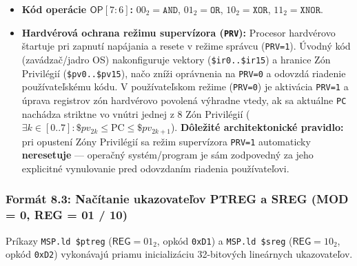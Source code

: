 \documentclass[11pt,a4paper]{article}
\newcommand{\reg}[1]{\texttt{#1}}
\newcommand{\field}[1]{\textsf{#1}}
\begin{document}
\begin{itemize}
  \item \textbf{Kód operácie $\field{OP} [7:6]$:} $00_2 = \texttt{AND}$, $01_2 = \texttt{OR}$, $10_2 = \texttt{XOR}$, $11_2 = \texttt{XNOR}$.
  \item \textbf{Hardvérová ochrana režimu supervízora (\texttt{PRV}):} Procesor hardvérovo štartuje pri zapnutí napájania a resete v režime správcu (\texttt{PRV=1}). Úvodný kód (zavádzač/jadro OS) nakonfiguruje vektory (\texttt{\$ir0..\$ir15}) a hranice Zón Privilégií (\texttt{\$pv0..\$pv15}), načo zníži oprávnenia na \texttt{PRV=0} a odovzdá riadenie používateľskému kódu. V používateľskom režime (\texttt{PRV=0}) je aktivácia \texttt{PRV=1} a úprava registrov zón hardvérovo povolená výhradne vtedy, ak sa aktuálne \reg{PC} nachádza striktne vo vnútri jednej z 8 Zón Privilégií ($\exists k \in [0..7]: \$pv_{2k} \le \text{PC} \le \$pv_{2k+1}$). \textbf{Dôležité architektonické pravidlo:} pri opustení Zóny Privilégií sa režim supervízora \texttt{PRV=1} automaticky \textbf{neresetuje} --- operačný systém/program je sám zodpovedný za jeho explicitné vynulovanie pred odovzdaním riadenia používateľovi.
\end{itemize}

\subsubsection{Formát 8.3: Načítanie ukazovateľov PTREG a SREG (MOD = 0, REG = 01 / 10)}
Príkazy \texttt{MSP.ld \$ptreg} ($\field{REG}=01_2$, opkód \texttt{0xD1}) a \texttt{MSP.ld \$sreg} ($\field{REG}=10_2$, opkód \texttt{0xD2}) vykonávajú priamu inicializáciu 32-bitových lineárnych ukazovateľov.
\end{document}
